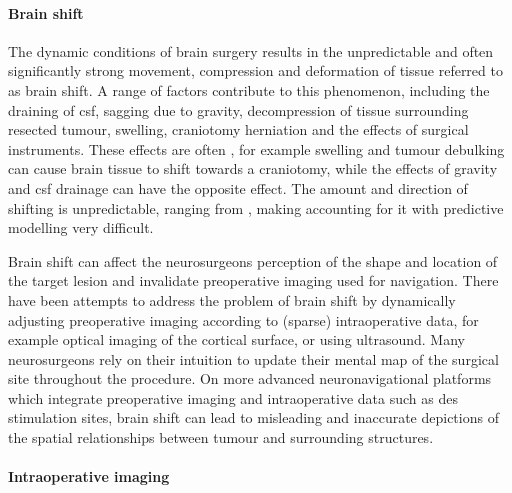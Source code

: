 \paragraph*{Brain shift}

The dynamic conditions of brain surgery results in the unpredictable and often significantly strong movement, compression and deformation of tissue referred to as brain shift.
A range of factors contribute to this phenomenon, including the draining of \gls{csf}, sagging due to gravity, decompression of tissue surrounding resected tumour, swelling, craniotomy herniation  and the effects of surgical instruments.
These effects are often , for example swelling and tumour debulking can cause brain tissue to shift towards a craniotomy, while the effects of gravity and \gls{csf} drainage can have the opposite effect.
The amount and direction of shifting is unpredictable, ranging from , making accounting for it with predictive modelling very difficult.

Brain shift can affect the neurosurgeons perception of the shape and location of the target lesion  and invalidate preoperative imaging used for navigation.
There have been attempts to address the problem of brain shift by dynamically adjusting preoperative imaging according to (sparse) intraoperative data, for example optical imaging of the cortical surface, or using ultrasound. 
Many neurosurgeons rely on their intuition to update their mental map of the surgical site throughout the procedure.
On more advanced neuronavigational platforms which integrate preoperative imaging and intraoperative data such as \gls{des} stimulation sites, brain shift can lead to misleading and inaccurate depictions of the spatial relationships between tumour and surrounding structures.

\paragraph*{Intraoperative imaging}

